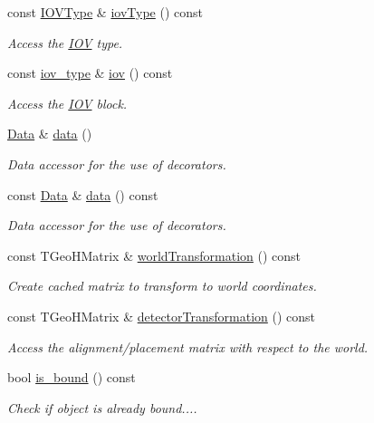 \begin{DoxyCompactItemize}
const \hyperlink{class_d_d4hep_1_1_i_o_v_type}{I\+O\+V\+Type} \& \hyperlink{class_d_d4hep_1_1_alignments_1_1_alignment_condition_ae50810ce4ba3293820a6796e8e531d1a}{iov\+Type} () const
\begin{DoxyCompactList}\small\item\em Access the \hyperlink{class_d_d4hep_1_1_i_o_v}{I\+OV} type. \end{DoxyCompactList}\item 
const \hyperlink{class_d_d4hep_1_1_alignments_1_1_alignment_condition_a95e1d25777aca1542555e477c8233968}{iov\+\_\+type} \& \hyperlink{class_d_d4hep_1_1_alignments_1_1_alignment_condition_a8807f4f0108dd9214494521ffe195cc2}{iov} () const
\begin{DoxyCompactList}\small\item\em Access the \hyperlink{class_d_d4hep_1_1_i_o_v}{I\+OV} block. \end{DoxyCompactList}\item 
\hyperlink{class_d_d4hep_1_1_alignments_1_1_alignment_condition_a6fcd9bd0e9ac67afcf43270cbd9e9983}{Data} \& \hyperlink{class_d_d4hep_1_1_alignments_1_1_alignment_condition_a29cd43941dc85481f8b63ee037041006}{data} ()
\begin{DoxyCompactList}\small\item\em Data accessor for the use of decorators. \end{DoxyCompactList}\item 
const \hyperlink{class_d_d4hep_1_1_alignments_1_1_alignment_condition_a6fcd9bd0e9ac67afcf43270cbd9e9983}{Data} \& \hyperlink{class_d_d4hep_1_1_alignments_1_1_alignment_condition_a1c02ce4a7860dd99cd29f37e9858255b}{data} () const
\begin{DoxyCompactList}\small\item\em Data accessor for the use of decorators. \end{DoxyCompactList}\item 
const T\+Geo\+H\+Matrix \& \hyperlink{class_d_d4hep_1_1_alignments_1_1_alignment_condition_ac209668b15833f27dc0d093b23fb4021}{world\+Transformation} () const
\begin{DoxyCompactList}\small\item\em Create cached matrix to transform to world coordinates. \end{DoxyCompactList}\item 
const T\+Geo\+H\+Matrix \& \hyperlink{class_d_d4hep_1_1_alignments_1_1_alignment_condition_a6c11f62a61a9cab323fdf5832d5d8578}{detector\+Transformation} () const
\begin{DoxyCompactList}\small\item\em Access the alignment/placement matrix with respect to the world. \end{DoxyCompactList}\item 
bool \hyperlink{class_d_d4hep_1_1_alignments_1_1_alignment_condition_a606d7b95919cd2c0d0d96e1a50f6bdcf}{is\+\_\+bound} () const
\begin{DoxyCompactList}\small\item\em Check if object is already bound.... \end{DoxyCompactList}\end{DoxyCompactItemize}
